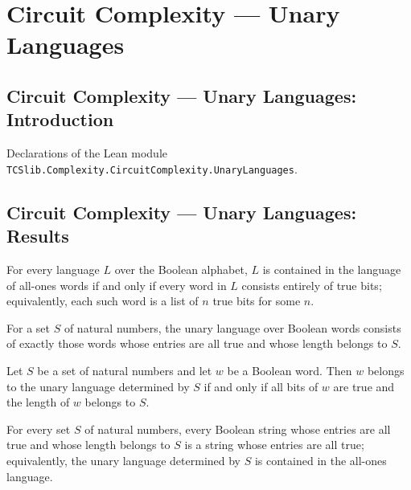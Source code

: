 \section{Circuit Complexity --- Unary Languages}
\subsection*{Circuit Complexity --- Unary Languages: Introduction}

Declarations of the Lean module \texttt{TCSlib.Complexity.CircuitComplexity.UnaryLanguages}.

\subsection*{Circuit Complexity --- Unary Languages: Results}

\begin{theorem}
\label{Language.le_allOnes_iff}
\leanok
{}
For every language $L$ over the Boolean alphabet, $L$ is contained in the language of
all-ones words if and only if every word in $L$ consists entirely of true bits;
equivalently, each such word is a list of $n$ true bits for some $n$.
\end{theorem}

\begin{definition}
\label{Language.unary}
\leanok
{}
For a set $S$ of natural numbers, the unary language over Boolean words consists of
exactly those words whose entries are all true and whose length belongs to $S$.
\end{definition}

\begin{theorem}
\label{Language.mem_unary_iff}
\leanok
{}
Let $S$ be a set of natural numbers and let $w$ be a Boolean word. Then $w$ belongs to
the unary language determined by $S$ if and only if all bits of $w$ are true and the
length of $w$ belongs to $S$.
\end{theorem}

\begin{theorem}
\label{Language.unary_le_allOnes}
\leanok
{}
For every set $S$ of natural numbers, every Boolean string whose entries are all true
and whose length belongs to $S$ is a string whose entries are all true; equivalently,
the unary language determined by $S$ is contained in the all-ones language.
\end{theorem}


